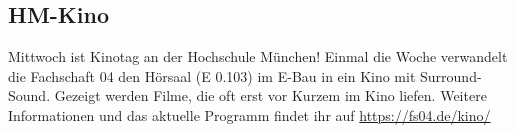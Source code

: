 \subsection{HM-Kino}
Mittwoch ist Kinotag an der Hochschule München! \doublebreak
Einmal die Woche verwandelt die Fachschaft 04 den Hörsaal (E 0.103) 
im E-Bau in ein Kino mit Surround-Sound. Gezeigt werden Filme, die oft 
erst vor Kurzem im Kino liefen. \doublebreak
Weitere Informationen und das aktuelle Programm findet ihr auf 
\url{https://fs04.de/kino/}